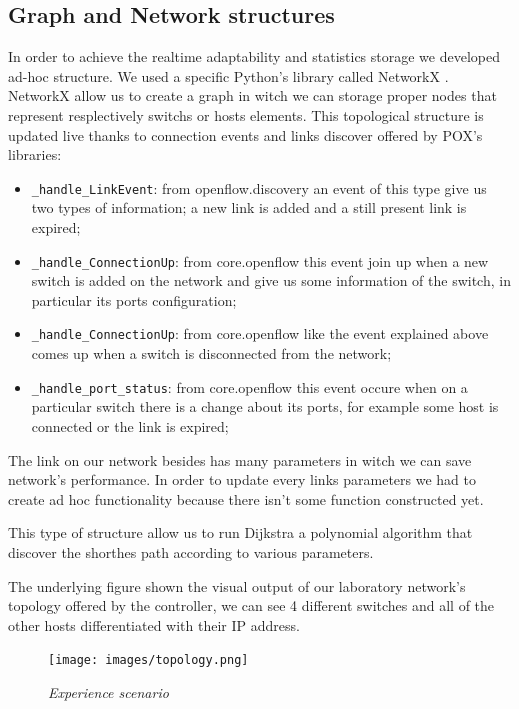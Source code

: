 \documentclass[article,10pt]{IEEEtran}
\begin{document}
\subsection{Graph and Network structures}
  In order to achieve the realtime adaptability and statistics storage we developed ad-hoc structure.
  We used a specific Python's library called NetworkX \cite{networkx}. NetworkX allow us to create a graph in witch we can storage proper nodes
  that represent resplectively switchs or hosts elements.
  This topological structure is updated live thanks to connection events and links discover offered by POX's libraries:
  \begin{itemize}
   \item \texttt{_handle_LinkEvent}: from openflow.discovery an event of this type give us two types of information; a new link is added and 
   a still present link is expired;
   \item \texttt{_handle_ConnectionUp}: from core.openflow this event join up when a new switch is added on the network and give us
   some information of the switch, in particular its ports configuration;
   \item \texttt{_handle_ConnectionUp}: from core.openflow like the event explained above comes up when a switch is disconnected from the network;
   \item \texttt{_handle_port_status}: from core.openflow this event occure when on a particular switch there is a change about its ports, for example
   some host is connected or the link is expired;\\
  \end{itemize}

  The link on our network besides has many parameters in witch we can save network's performance. 
  In order to update every links parameters we had to create ad hoc functionality
  because there isn't some function constructed yet.
  
  This type of structure allow us to run Dijkstra a polynomial algorithm that discover the shorthes path according to various parameters.
  
  The underlying figure shown the visual output of our laboratory network's topology offered by the controller, we can see 4 different switches and all of the other hosts
  differentiated with their IP address.
  
  \begin{figure}[!h]
 \centering
 \texttt{[image: images/topology.png]}
 \caption{\emph{Experience scenario}}
 \label{fig:topo}
  \end{figure}
  
\end{document}
